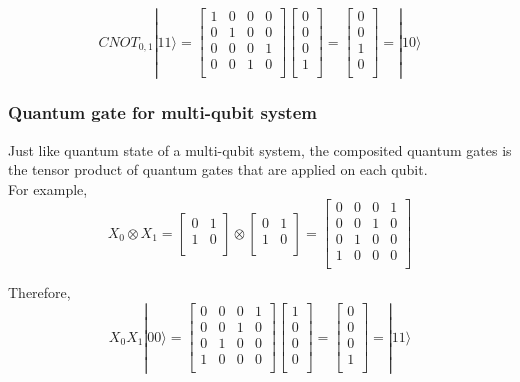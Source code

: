 $$CNOT_{0,1}|11\rangle = 
\begin{bmatrix}
1 & 0 & 0 & 0 \\
0 & 1 & 0 & 0 \\
0 & 0 & 0 & 1 \\
0 & 0 & 1 & 0 \\
\end{bmatrix}
 \left[
\begin{array}{c}
0 \\
0 \\
0 \\
1 \\
\end{array}
\right]
=  \left[
\begin{array}{c}
0 \\
0 \\
1 \\
0 \\
\end{array}
\right] 
= |10\rangle 
$$

\subsubsection{Quantum gate for multi-qubit system}

Just like quantum state of a multi-qubit system, the composited quantum gates is the tensor product of quantum gates that are applied on each qubit.  \\For example, 
$$ X_0 \otimes X_1 = 
\begin{bmatrix}
0 & 1 \\
1 & 0 \\
\end{bmatrix}
\otimes
 \begin{bmatrix}
0 & 1 \\
1 & 0 \\
\end{bmatrix}
=  \begin{bmatrix}
0 & 0 & 0 & 1 \\
0 & 0 & 1 & 0 \\
0 & 1 & 0 & 0 \\
1 & 0 & 0 & 0 \\
\end{bmatrix}
$$

Therefore, 
$$ X_0X_1 |00\rangle = 
\begin{bmatrix}
0 & 0 & 0 & 1 \\
0 & 0 & 1 & 0 \\
0 & 1 & 0 & 0 \\
1 & 0 & 0 & 0 \\
\end{bmatrix}
\left[
\begin{array}{c}
1 \\
0 \\
0 \\
0 \\
\end{array}
\right] 
= \left[
\begin{array}{c}
0 \\
0 \\
0 \\
1 \\
\end{array}
\right] 
= |11\rangle
$$

